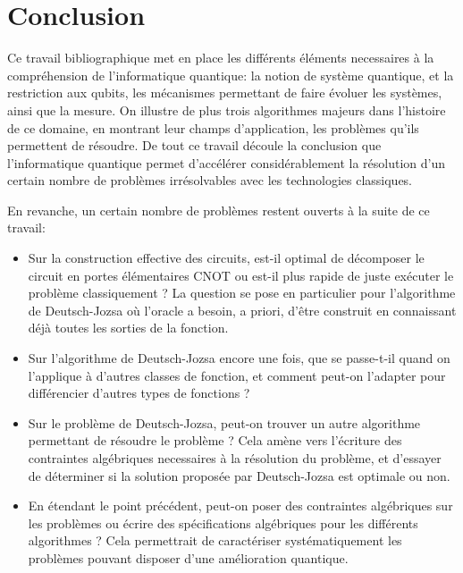 \chapter{Conclusion}

Ce travail bibliographique met en place les différents éléments necessaires à la compréhension de l'informatique quantique: la notion de système quantique, et la restriction aux qubits, les mécanismes permettant de faire évoluer les systèmes, ainsi que la mesure. On illustre de plus trois algorithmes majeurs dans l'histoire de ce domaine, en montrant leur champs d'application, les problèmes qu'ils permettent de résoudre. De tout ce travail découle la conclusion que l'informatique quantique permet d'accélérer considérablement la résolution d'un certain nombre de problèmes irrésolvables avec les technologies classiques.

En revanche, un certain nombre de problèmes restent ouverts à la suite de ce travail:

\begin{itemize}
    \item Sur la construction effective des circuits, est-il optimal de décomposer le circuit en portes élémentaires CNOT ou est-il plus rapide de juste exécuter le problème classiquement ? La question se pose en particulier pour l'algorithme de Deutsch-Jozsa où l'oracle a besoin, a priori, d'être construit en connaissant déjà toutes les sorties de la fonction.
    \item Sur l'algorithme de Deutsch-Jozsa encore une fois, que se passe-t-il quand on l'applique à d'autres classes de fonction, et comment peut-on l'adapter pour différencier d'autres types de fonctions ?
    \item Sur le problème de Deutsch-Jozsa, peut-on trouver un autre algorithme permettant de résoudre le problème ? Cela amène vers l'écriture des contraintes algébriques necessaires à la résolution du problème, et d'essayer de déterminer si la solution proposée par Deutsch-Jozsa est optimale ou non.
    \item En étendant le point précédent, peut-on poser des contraintes algébriques sur les problèmes ou écrire des spécifications algébriques pour les différents algorithmes ? Cela permettrait de caractériser systématiquement les problèmes pouvant disposer d'une amélioration quantique.
\end{itemize}